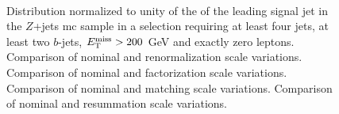 \begin{figure}[h!]
\centering 
{}
\\
\caption{Distribution normalized to unity of the \pt of the leading signal jet in the $Z$+jets \gls{mc} sample in a selection requiring at least four jets, at least two $b$-jets, $E_{\rm T}^{\mathrm{miss}}>200$ GeV and exactly zero leptons. 
 Comparison of nominal and renormalization scale variations.
 Comparison of nominal and factorization scale variations.
 Comparison of nominal and matching scale variations.
 Comparison of nominal and resummation scale variations.
}\label{fig:W_met_0L_syst}
\end{figure}


